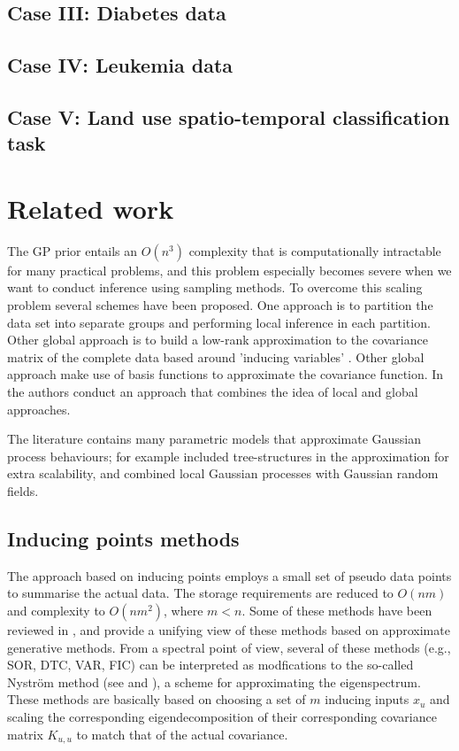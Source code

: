 \documentclass[]{interact}
\theoremstyle{plain}%
\theoremstyle{definition}
\theoremstyle{remark}
\begin{document}
\subsection{Case III: Diabetes data}\label{sec:bf_caseIV}
\subsection{Case IV: Leukemia data}\label{sec:bf_caseV}
\subsection{Case V: Land use spatio-temporal classification task}\label{sec:bf_caseVII}

\vspace{3mm}
\appendix

\section{Related work}

The GP prior entails an $O(n^3)$ complexity that is computationally intractable for many practical problems, and this problem especially becomes severe when we want to conduct inference using sampling methods. To overcome this scaling problem several schemes have been proposed. One approach is to partition the data set into separate groups \citep{snelson2007local, urtasun2008sparse} and performing local inference in each partition. Other global approach is to build a low-rank approximation to the covariance matrix of the complete data based around 'inducing variables' \citep{quinonero2005unifying,bui2017unifying}. Other global approach make use of basis functions to approximate the covariance function. In \cite{snelson2007local} the authors conduct an approach that combines the idea of local and global approaches.

The literature contains many parametric models that approximate Gaussian process behaviours; for example \cite{bui2014tree} included  tree-structures in the approximation for extra scalability, and \cite{moore2015gaussian} combined local Gaussian
processes with Gaussian random fields.

\subsection{Inducing points methods}

The approach based on inducing points employs a small set of pseudo data points to summarise the actual data. The storage requirements are reduced to $O(nm)$ and complexity to $O(nm^2)$, where $m < n$. Some of these methods have been reviewed in \cite{rasmussen2006gaussian}, and \cite{quinonero2005unifying} provide a unifying view of these methods based on approximate generative methods. From a spectral point of view, several of these methods (e.g., SOR, DTC, VAR, FIC) can be interpreted as modfications to the so-called Nystr{\"o}m method (see \cite{arthur1979baker} and \cite{williams2001using}), a scheme for approximating the eigenspectrum. These methods are basically based on choosing a set of $m$ inducing inputs $x_u$ and scaling the corresponding eigendecomposition of their corresponding covariance matrix $K_{u,u}$ to match that of the actual covariance. 
\end{document}

